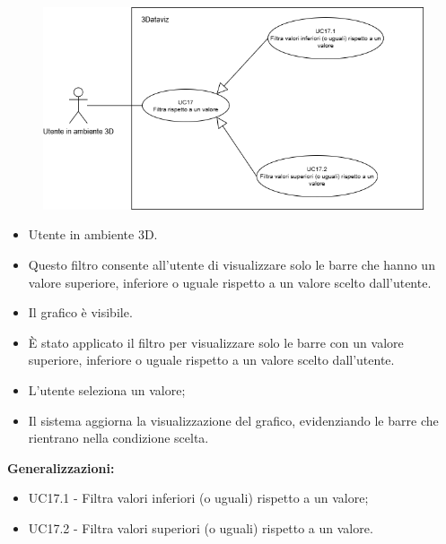 \begin{figure}[H]\centering
    \includegraphics[scale=0.7]{template/images/UC17.png}
    \caption{}
\end{figure}
\UCdsc
{ %
    \begin{itemize}
        \item Utente in ambiente 3D.
    \end{itemize}
}
{ %
    \begin{itemize}
        \item Questo filtro consente all'utente di visualizzare solo le barre che hanno un valore superiore, inferiore o uguale rispetto a un valore scelto dall’utente. 
    \end{itemize}
}
{ %
    \begin{itemize}
        \item Il grafico è visibile.
    \end{itemize}
}
{ %
    \begin{itemize}
        \item È stato applicato il filtro per visualizzare solo le barre con un valore superiore, inferiore o uguale rispetto a un valore scelto dall’utente.
    \end{itemize}
}
{ %
    \begin{itemize}
        \item L’utente seleziona un valore;
        \item Il sistema aggiorna la visualizzazione del grafico, evidenziando le barre che rientrano nella condizione scelta.
    \end{itemize}
        \item \textbf{Generalizzazioni:} \begin{itemize}
            \item UC17.1 - Filtra valori inferiori (o uguali) rispetto a un valore;
            \item UC17.2 - Filtra valori superiori (o uguali) rispetto a un valore.
        \end{itemize}
    
}


